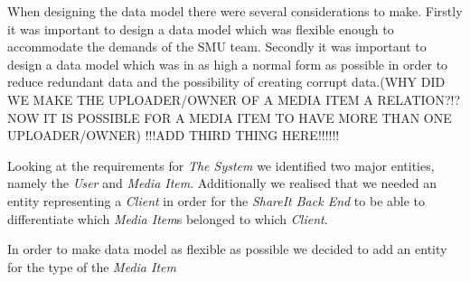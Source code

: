 \documentclass[../report.tex]{subfiles}
\begin{document}
When designing the data model there were several considerations to make. Firstly it was important to design a data model which was flexible enough to accommodate the demands of the SMU team. Secondly it was important to design a data model which was in as high a normal form as possible in order to reduce redundant data and the possibility of creating corrupt data.(WHY DID WE MAKE THE UPLOADER/OWNER OF A MEDIA ITEM A RELATION?!? NOW IT IS POSSIBLE FOR A MEDIA ITEM TO HAVE MORE THAN ONE UPLOADER/OWNER) !!!ADD THIRD THING HERE!!!!!!

Looking at the requirements for \textit{The System} we identified two major entities, namely the \textit{User} and \textit{Media Item}. Additionally we realised that we needed an entity representing a \textit{Client} in order for the \textit{ShareIt Back End} to be able to differentiate which \textit{Media Item}s belonged to which \textit{Client}. 

In order to make data model as flexible as possible we decided to add an entity for the type of the \textit{Media Item}
\end{document}
